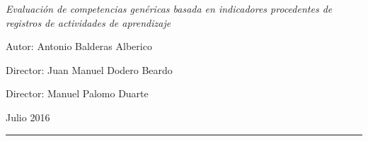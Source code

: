 
\thispagestyle{empty}

\hfill

\vfill

\medskip


\noindent
\textit{
Evaluación de competencias genéricas basada en indicadores procedentes de registros de actividades de aprendizaje
}


\bigskip

Autor: Antonio Balderas Alberico

Director: Juan Manuel Dodero Beardo

Director: Manuel Palomo Duarte



\vfill

\vfill



\noindent

\noindent
Julio 2016

\vspace{1cm}
\hrule
\bigskip

\cleardoublepage

%
%
%
%
%
%

